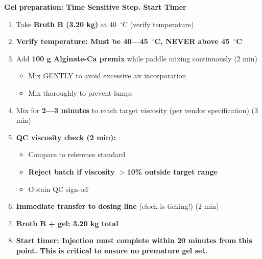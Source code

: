 {\textbf{Gel preparation: Time Sensitive Step. Start Timer}
\begin{enumerate}[leftmargin=1.5em]
\textbf{Log Start Time in Timesheet:} \_\_\_\_\_
\textbf Ensure less than 5 minutes between End Time in Step 5 and Start Time in Step 6. 
\item Take \textbf{Broth B (3.20 kg)} at 40~$^\circ$C (verify temperature)
\item \textbf{Verify temperature: Must be 40---45~$^\circ$C, NEVER above 45~$^\circ$C}
\item Add \textbf{100 g Alginate-Ca premix} while paddle mixing continuously (2 min)
  \begin{itemize}
  \item Mix GENTLY to avoid excessive air incorporation
  \item Mix thoroughly to prevent lumps
  \end{itemize}
\item Mix for \textbf{2---3 minutes} to reach target viscosity (per vendor specification) (3 min)
\item \textbf{QC viscosity check (2 min):}
  \begin{itemize}
  \item Compare to reference standard
  \item \textbf{Reject batch if viscosity $>$10\% outside target range}
  \item Obtain QC sign-off
  \end{itemize}
\item \textbf{Immediate transfer to dosing line} (clock is ticking!) (2 min)
\item \textbf{Broth B + gel: 3.20 kg total}
\item \textbf{Start timer: Injection must complete within 20 minutes from this point. This is critical to ensure no premature gel set.}
\end{enumerate}

}
